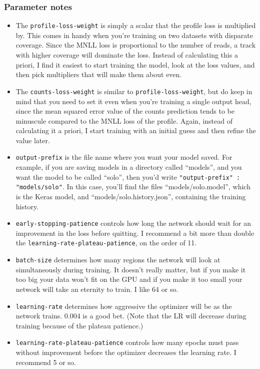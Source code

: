 \documentclass{article}
\begin{document}
\subsubsection{Parameter notes}

\begin{itemize}
    \item The \texttt{profile-loss-weight} is simply a scalar that the profile loss is multiplied by. This comes in handy when you're training on two datasets with disparate coverage. Since the MNLL loss is proportional to the number of reads, a track with higher coverage will dominate the loss. Instead of calculating this a priori, I find it easiest to start training the model, look at the loss values, and then pick multipliers that will make them about even. 
    \item The \texttt{counts-loss-weight} is similar to \texttt{profile-loss-weight}, but do keep in mind that you need to set it even when you're training a single output head, since the mean squared error value of the counts prediction tends to be minuscule compared to the MNLL loss of the profile. Again, instead of calculating it a priori, I start training with an initial guess and then refine the value later. 
    \item \texttt{output-prefix} is the file name where you want your model saved. For example, if you are saving models in a directory called ``models'', and you want the model to be called ``solo'', then you'd write \texttt{"output-prefix" : "models/solo"}. In this case, you'll find the files ``models/solo.model'', which is the Keras model, and ``models/solo.history.json'', containing the training history. 
    \item \texttt{early-stopping-patience} controls how long the network should wait for an improvement in the loss before quitting. I recommend a bit more than double the \texttt{learning-rate-plateau-patience}, on the order of 11. 
    \item \texttt{batch-size} determines how many regions the network will look at simultaneously during training. It doesn't really matter, but if you make it too big your data won't fit on the GPU and if you make it too small your network will take an eternity to train. I like 64 or so. 
    \item \texttt{learning-rate} determines how aggressive the optimizer will be as the network trains. 0.004 is a good bet. (Note that the LR will decrease during training because of the plateau patience.)
    \item \texttt{learning-rate-plateau-patience} controls how many epochs must pass without improvement before the optimizer decreases the learning rate. I recommend 5 or so. 


\end{itemize}
\end{document}
